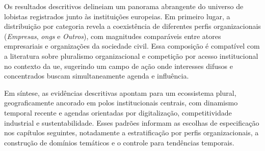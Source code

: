 Os resultados descritivos delineiam um panorama abrangente do universo de lobistas registrados junto às instituições europeias. Em primeiro lugar, a distribuição por categoria revela a coexistência de diferentes perfis organizacionais (\textit{Empresas}, \textit{\acrshort{ong}s} e \textit{Outros}), com magnitudes comparáveis entre atores empresariais e organizações da sociedade civil. Essa composição é compatível com a literatura sobre pluralismo organizacional e competição por acesso institucional no contexto da \acrshort{ue}, sugerindo um campo de ação onde interesses difusos e concentrados buscam simultaneamente agenda e influência.

Em síntese, as evidências descritivas apontam para um ecossistema plural, geograficamente ancorado em polos institucionais centrais, com dinamismo temporal recente e agendas orientadas por digitalização, competitividade industrial e sustentabilidade. Esses padrões informam as escolhas de especificação nos capítulos seguintes, notadamente a estratificação por perfis organizacionais, a construção de domínios temáticos e o controle para tendências temporais.

